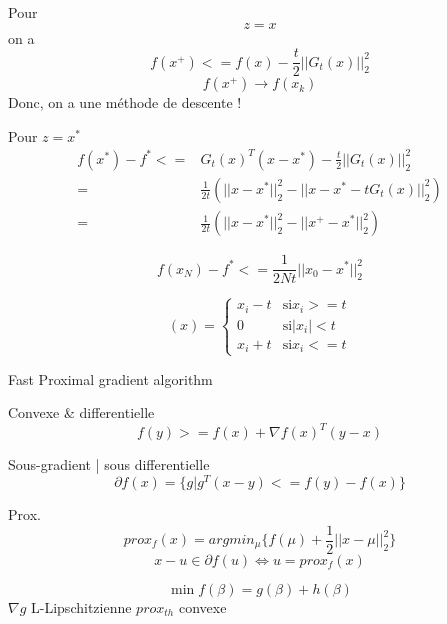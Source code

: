 \documentclass{article}
\begin{document}
Pour
\begin{equation}
z=x
\end{equation}
on a
\begin{equation}
f(x^+)<=f(x)-\frac{t}{2}||G_t(x)||_2^2
\end{equation}
\begin{equation}
f(x^+)\to f(x_k)
\end{equation}
Donc, on a une m\'ethode de descente !

Pour $z=x^*$
\begin{equation}
\begin{split}
f(x^*)-f^*<=&G_t(x)^T(x-x^*)-\frac{t}{2}||G_t(x)||_2^2\\
=& \frac{1}{2t}(||x-x^*||_2^2-||x-x^*-tG_t(x)||_2^2)\\
=& \frac{1}{2t}(||x-x^*||_2^2-||x^+-x^*||_2^2)
\end{split}
\end{equation}

\begin{equation}
f(x_N)-f^*<=\frac{1}{2Nt}||x_0-x^*||_2^2
\end{equation}

\begin{equation}
[prox_{t||\dot||_1}](x)=\left\{\begin{array}{rcl}
x_i-t & \text{si} x_i>=t\\
0 & \text{si} |x_i|<t\\
x_i+t & \text{si} x_i <=t
\end{array}\right.
\end{equation}

Fast Proximal gradient algorithm

Convexe \& differentielle
\begin{equation}
f(y)>=f(x)+\nabla f(x)^T(y-x)
\end{equation}

Sous-gradient | sous differentielle
\begin{equation}
\partial f(x)=\{g|g^T(x-y)<=f(y)-f(x)\}
\end{equation}

Prox.
\begin{equation}
prox_f (x) = argmin_\mu \{f(\mu)+\frac{1}{2}||x-\mu||^2_2\}
\end{equation}
\begin{equation}
x-u\in\partial f(u) \Leftrightarrow u=prox_f (x)
\end{equation}

\begin{equation}
\min f(\beta)=g(\beta)+h(\beta)
\end{equation}
$\nabla g$ L-Lipschitzienne
$prox_{th}$ convexe
\end{document}
